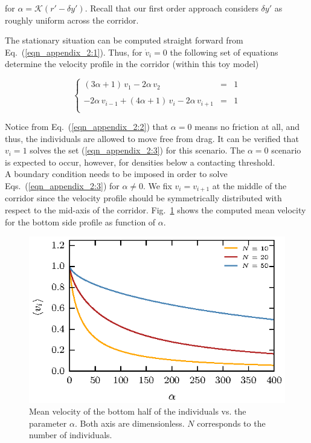\noindent for $\alpha=\mathcal{K}(r'-\delta y')$. Recall that our first order 
approach considers $\delta y'$ as roughly uniform across the corridor. 

The stationary situation can be computed straight forward from 
Eq.~(\ref{eqn_appendix_2:1}). Thus, for $\dot{v}_{i}=0$ the following set of 
equations determine the velocity profile in the corridor (within this toy 
model)

\begin{equation}
  \left\{\begin{array}{lcl}
          (3\alpha+1)\,v_{1} - 2\alpha\,v_{2} & = & 1 \\
          & & \\
          -2\alpha\,v_{i-1}+(4\alpha+1)\,v_i-2\alpha\,v_{i+1} & = & 1\\
         \end{array}\right.\label{eqn_appendix_2:3}
\end{equation}

Notice from  Eq.~(\ref{eqn_appendix_2:2}) that $\alpha=0$ means no friction at 
all, and thus, the individuals are allowed to move free from drag. It can be 
verified that $v_i=1$ solves the set (\ref{eqn_appendix_2:3}) for this 
scenario. The $\alpha=0$ scenario is expected to occur, however, for densities 
below a contacting threshold. \\

A boundary condition needs to be imposed in order to solve 
Eqs.~(\ref{eqn_appendix_2:3}) for $\alpha\neq 0$. We fix 
$v_i=v_{i+1}$ at the middle of the corridor since the velocity profile 
should be symmetrically distributed with respect to the mid-axis of the 
corridor. Fig.~\ref{fig:appendix_2:1} shows the computed mean velocity for the 
bottom side profile as function of $\alpha$.\\


\begin{figure}[htbp!]
\includegraphics[width=\columnwidth]
{./plots/fig_velocity_model.eps}
\caption{\label{fig:appendix_2:1} Mean velocity of the bottom half of the 
individuals vs. the parameter $\alpha$. Both axis are dimensionless. $N$ 
corresponds to the number of individuals. }
\end{figure}

